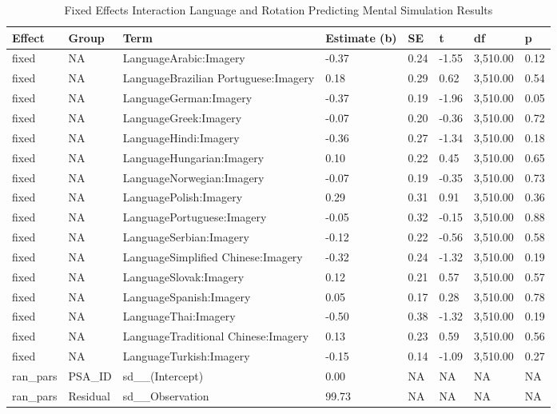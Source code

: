 \documentclass[
  man,floatsintext]{apa7}
\begin{document}
\begin{table}[tbp]

\begin{center}
\begin{threeparttable}

\caption{\label{tab:pred_interact_2}Fixed Effects Interaction Language and Rotation Predicting Mental Simulation Results}

\small{

\begin{tabular}{llllllll}
\toprule
Effect & Group & Term & Estimate (b) & SE & t & df & p\\
\midrule
fixed & NA & LanguageArabic:Imagery & -0.37 & 0.24 & -1.55 & 3,510.00 & 0.12\\
fixed & NA & LanguageBrazilian Portuguese:Imagery & 0.18 & 0.29 & 0.62 & 3,510.00 & 0.54\\
fixed & NA & LanguageGerman:Imagery & -0.37 & 0.19 & -1.96 & 3,510.00 & 0.05\\
fixed & NA & LanguageGreek:Imagery & -0.07 & 0.20 & -0.36 & 3,510.00 & 0.72\\
fixed & NA & LanguageHindi:Imagery & -0.36 & 0.27 & -1.34 & 3,510.00 & 0.18\\
fixed & NA & LanguageHungarian:Imagery & 0.10 & 0.22 & 0.45 & 3,510.00 & 0.65\\
fixed & NA & LanguageNorwegian:Imagery & -0.07 & 0.19 & -0.35 & 3,510.00 & 0.73\\
fixed & NA & LanguagePolish:Imagery & 0.29 & 0.31 & 0.91 & 3,510.00 & 0.36\\
fixed & NA & LanguagePortuguese:Imagery & -0.05 & 0.32 & -0.15 & 3,510.00 & 0.88\\
fixed & NA & LanguageSerbian:Imagery & -0.12 & 0.22 & -0.56 & 3,510.00 & 0.58\\
fixed & NA & LanguageSimplified Chinese:Imagery & -0.32 & 0.24 & -1.32 & 3,510.00 & 0.19\\
fixed & NA & LanguageSlovak:Imagery & 0.12 & 0.21 & 0.57 & 3,510.00 & 0.57\\
fixed & NA & LanguageSpanish:Imagery & 0.05 & 0.17 & 0.28 & 3,510.00 & 0.78\\
fixed & NA & LanguageThai:Imagery & -0.50 & 0.38 & -1.32 & 3,510.00 & 0.19\\
fixed & NA & LanguageTraditional Chinese:Imagery & 0.13 & 0.23 & 0.59 & 3,510.00 & 0.56\\
fixed & NA & LanguageTurkish:Imagery & -0.15 & 0.14 & -1.09 & 3,510.00 & 0.27\\
ran\_pars & PSA\_ID & sd\_\_(Intercept) & 0.00 & NA & NA & NA & NA\\
ran\_pars & Residual & sd\_\_Observation & 99.73 & NA & NA & NA & NA\\
\bottomrule
\end{tabular}

}

\end{threeparttable}
\end{center}

\end{table}
\end{document}
